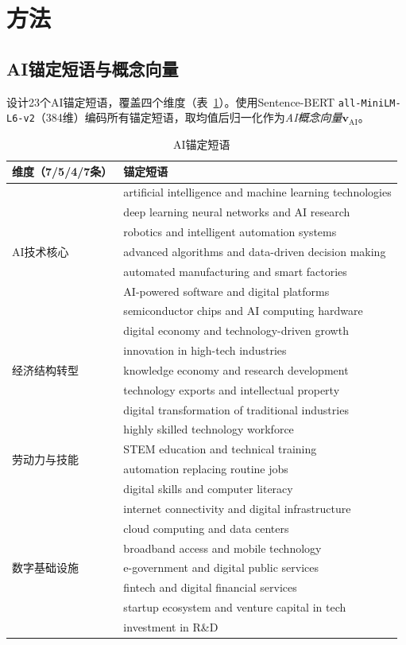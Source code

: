 \documentclass[11pt,a4paper]{article}
\begin{document}
\section{方法}

\subsection{AI锚定短语与概念向量}
设计23个AI锚定短语，覆盖四个维度（表~\ref{tab:anchors}）。使用Sentence-BERT \texttt{all-MiniLM-L6-v2}（384维）编码所有锚定短语，取均值后归一化作为\emph{AI概念向量}$\mathbf{v}_{\text{AI}}$。

\begin{table}[H]\centering\footnotesize
\caption{AI锚定短语}\label{tab:anchors}
\begin{tabular}{ll}
\toprule\textbf{维度（7/5/4/7条）} & \textbf{锚定短语} \\
\midrule
\multirow{7}{*}{AI技术核心}
& artificial intelligence and machine learning technologies \\
& deep learning neural networks and AI research \\
& robotics and intelligent automation systems \\
& advanced algorithms and data-driven decision making \\
& automated manufacturing and smart factories \\
& AI-powered software and digital platforms \\
& semiconductor chips and AI computing hardware \\
\midrule
\multirow{5}{*}{经济结构转型}
& digital economy and technology-driven growth \\
& innovation in high-tech industries \\
& knowledge economy and research development \\
& technology exports and intellectual property \\
& digital transformation of traditional industries \\
\midrule
\multirow{4}{*}{劳动力与技能}
& highly skilled technology workforce \\
& STEM education and technical training \\
& automation replacing routine jobs \\
& digital skills and computer literacy \\
\midrule
\multirow{7}{*}{数字基础设施}
& internet connectivity and digital infrastructure \\
& cloud computing and data centers \\
& broadband access and mobile technology \\
& e-government and digital public services \\
& fintech and digital financial services \\
& startup ecosystem and venture capital in tech \\
& investment in R\&D \\
\bottomrule
\end{tabular}
\end{table}
\end{document}
